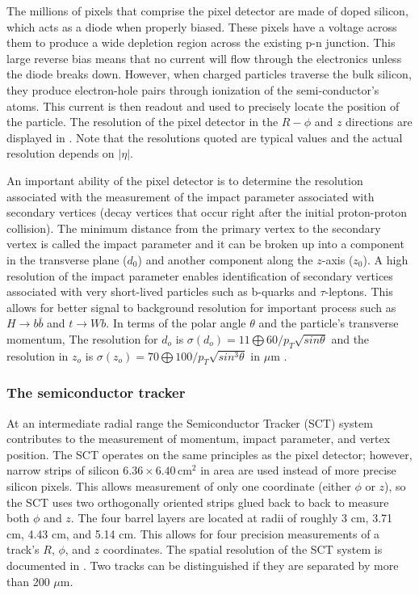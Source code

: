 The millions of pixels that comprise the pixel detector are made of
doped silicon, which acts as a diode when properly biased. These
pixels have a voltage across them to produce a wide depletion region across
the existing p-n junction. This large reverse bias means that no current
will flow through the electronics unless the diode breaks down. However,
when charged particles traverse the bulk silicon, they produce electron-hole pairs
through ionization of the semi-conductor's atoms. This current is then readout
and used to precisely locate the position of the particle. The resolution of
the pixel detector in the $R-\phi$ and $z$ directions 
are displayed in . Note that the resolutions
quoted are typical values and the actual resolution depends on $|\eta|$.

An important 
ability of the pixel detector is to determine the resolution associated with
the measurement of the impact parameter associated with secondary vertices
(decay vertices that occur right after the initial proton-proton collision). 
The minimum distance from the primary vertex to the secondary vertex is called
the impact parameter and it can be broken up into a component in the transverse
plane ($d_0$) and another component along the $z$-axis ($z_0$). A high resolution
of the impact parameter enables identification of secondary vertices
associated with very short-lived particles such as 
b-quarks and $\tau$-leptons. This allows for
better signal to background resolution for important process such as
$H \to b\bar b$ and $t \to W b$. In terms of
the polar angle $\theta$ and the particle's transverse momentum, 
The resolution for $d_o$ is
$\sigma(d_o) = 11 \bigoplus 60/p_T \sqrt{sin\theta}$ and the resolution in $z_o$
is $\sigma(z_o) = 70 \bigoplus 100/p_T \sqrt{sin^3\theta}$ in $\mu$m 
\cite{Aad:2008zzm}.

\subsubsection*{The semiconductor tracker}
At an intermediate radial range the Semiconductor Tracker (SCT) system contributes
to the measurement of momentum, impact parameter, and vertex position.
The SCT operates on the same principles as the pixel
detector; however, narrow strips of silicon $6.36 \times 6.40 \, \text{cm}^2$
in area are used instead of more precise silicon pixels. 
This allows measurement of only one coordinate (either $\phi$ or $z$), so the
SCT uses two orthogonally oriented strips glued back to back to measure both
$\phi$ and $z$. The four barrel layers are located at radii of roughly 3 cm,
3.71 cm, 4.43 cm, and 5.14 cm. This allows for four precision measurements of
a track's $R$, $\phi$, and $z$ coordinates. 
The spatial resolution of the SCT system is documented in .
Two tracks can be distinguished if they are separated by more than 200 $\mu$m.

